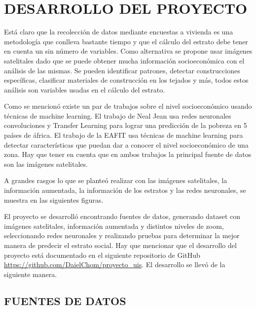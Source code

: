  
\newpage\chapter{DESARROLLO DEL PROYECTO} 

Está claro que la recolección de datos mediante encuestas a vivienda es una metodología que conlleva bastante tiempo y que el cálculo del estrato debe tener en cuenta un sin número de variables. Como alternativa se propone usar imágenes satelitales dado que se puede obtener mucha información socioeconómica con el análisis de las mismas. Se pueden identificar patrones, detectar construcciones específicas, clasificar materiales de construcción en los tejados y más, todos estos análisis son variables usadas en el cálculo del estrato.
  
Como se mencionó existe un par de trabajos sobre el nivel socioeconómico usando técnicas de machine learning. El trabajo de Neal Jean usa redes neuronales convoluciones y Transfer Learning para lograr una predicción de la pobreza en 5 países de áfrica. El trabajo de la EAFIT usa técnicas de machine learning para detectar características que puedan dar a conocer el nivel socioeconómico de una zona. Hay que tener en cuenta que en ambos trabajos la principal fuente de datos son las imágenes satelitales.
 
A grandes rasgos lo que se planteó realizar con las imágenes satelitales, la información aumentada, la información de los estratos y las redes neuronales, se muestra en las siguientes figuras.

 {}

El proyecto se desarrolló encontrando fuentes de datos, generando dataset con imágenes satelitales, información aumentada y distintos niveles de zoom, seleccionando redes neuronales y realizando pruebas para determinar la mejor manera de predecir el estrato social. Hay que mencionar que el desarrollo del proyecto está documentado en el siguiente repositorio de GitHub \url{https://github.com/DaielChom/proyecto_uis}. El desarrollo se llevó de la siguiente manera.

 
 \section{FUENTES DE DATOS}
 
